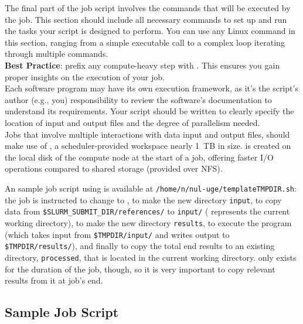 
The final part of the job script involves the commands that will be executed by the job.
This section should include all necessary commands to set up and run the tasks 
your script is designed to perform. You can use any Linux command in this section, 
ranging from a simple executable call to a complex loop iterating through multiple commands.\\

\noindent \textbf{Best Practice}: prefix any compute-heavy step with .
This ensures you gain proper insights on the execution of your job.\\

\noindent Each software program may have its own execution framework, as it's the script's author (e.g., you) 
responsibility to review the software's documentation to understand its requirements.
Your script should be written to clearly specify the location of input and output files and the degree of parallelism needed.\\

\noindent Jobs that involve multiple interactions with data input and output files, should make use of , 
a scheduler-provided workspace nearly 1~TB in size.
 is created on the local disk of the compute node at the start of a job, offering faster I/O operations 
compared to shared storage (provided over NFS).

An sample job script using  is available at \texttt{/home/n/nul-uge/templateTMPDIR.sh}: 
the job is instructed to change to , to make the new directory \texttt{input}, to copy data from
\texttt{\$SLURM\_SUBMIT\_DIR/references/} to \texttt{input/} ( represents the
current working directory), to make the new directory \texttt{results}, to
execute the program (which takes input from \texttt{\$TMPDIR/input/} and writes
output to \texttt{\$TMPDIR/results/}), and finally to copy the total end results
to an existing directory, \texttt{processed}, that is located in the current
working directory.
 only exists for the duration of the job, though,
so it is very important to copy relevant results from it at job's end.

\subsection{Sample Job Script}
\label{sect:sample-job-script}

